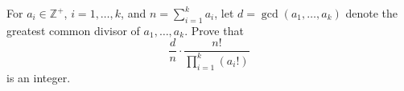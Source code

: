 For $ a_i \in \mathbb{Z}^+$, $ i = 1, \ldots, k$, and $ n = \sum^k_{i = 1} a_i$, let $ d = \gcd(a_1, \ldots, a_k)$ denote the greatest common divisor of $ a_1, \ldots, a_k$. Prove that $$ \frac{d}{n} \cdot \frac{n!}{\prod\limits^k_{i = 1} (a_i!)}$$ is an integer.
